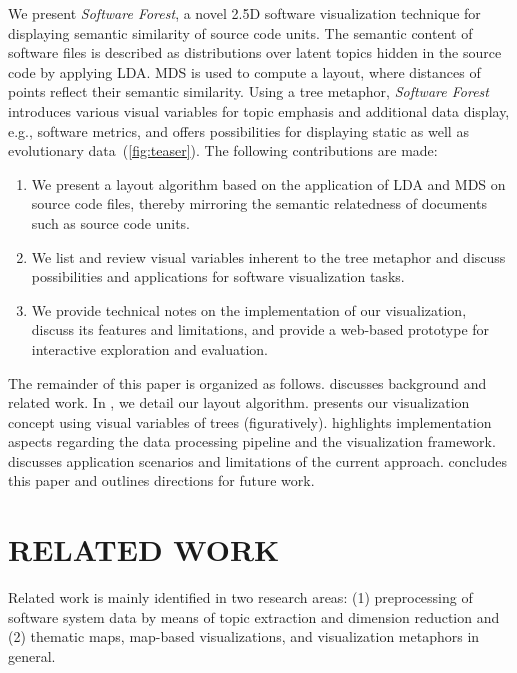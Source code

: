 \documentclass[a4paper,twoside]{article}
\begin{document}
We present \emph{Software Forest}, a novel 2.5D software visualization technique for displaying semantic similarity of source code units.
The semantic content of software files is described as distributions over latent topics hidden in the source code by applying \ac{LDA}.
\ac{MDS} is used to compute a layout, where distances of points reflect their semantic similarity.
Using a tree metaphor, \emph{Software Forest} introduces various visual variables for topic emphasis and additional data display, e.g., software metrics, and offers possibilities for displaying static as well as evolutionary data~(\autoref{fig:teaser}).
The following contributions are made:
\begin{enumerate}
    \item We present a layout algorithm based on the application of \ac{LDA} and \ac{MDS} on source code files, thereby mirroring the semantic relatedness of documents such as source code units.
    \item We list and review visual variables inherent to the tree metaphor and discuss possibilities and applications for software visualization tasks.
    \item We provide technical notes on the implementation of our visualization, discuss its features and limitations, and provide a web-based prototype for interactive exploration and evaluation.
\end{enumerate}

The remainder of this paper is organized as follows.
 discusses background and related work.
In , we detail our layout algorithm.
 presents our visualization concept using visual variables of trees (figuratively).
 highlights implementation aspects regarding the data processing pipeline and the visualization framework.
 discusses application scenarios and limitations of the current approach.
 concludes this paper and outlines directions for future work.

\section{\uppercase{Related Work}}
\label{sec:related work}
\noindent
Related work is mainly identified in two research areas: (1) preprocessing of software system data by means of topic extraction and dimension reduction and (2) thematic maps, map-based visualizations, and visualization metaphors in general. 
\end{document}
